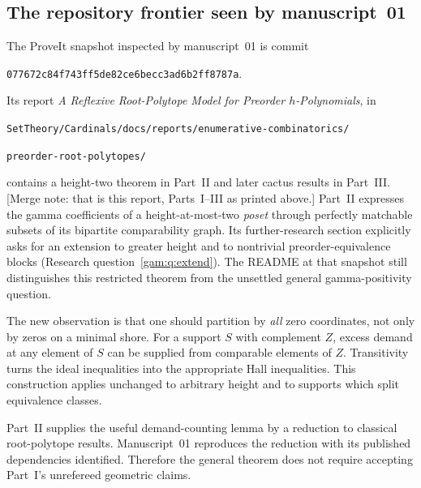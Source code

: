 \documentclass[11pt]{article}
\numberwithin{equation}{section}
\theoremstyle{definition}
\begin{document}
\subsection{The repository frontier seen by manuscript~01}
The ProveIt snapshot inspected by manuscript~01 is commit
\begin{center}
\small\texttt{077672c84f743ff5de82ce6becc3ad6b2ff8787a}.
\end{center}
Its report \emph{A Reflexive Root-Polytope Model for Preorder
$h$-Polynomials}, in
\begin{center}\small
\nolinkurl{SetTheory/Cardinals/docs/reports/enumerative-combinatorics/}\par
\nolinkurl{preorder-root-polytopes/}
\end{center}
contains a height-two theorem in Part~II and later cactus results in
Part~III. [Merge note: that is this report, Parts~I--III as printed above.]
Part~II expresses the gamma coefficients of a height-at-most-two
\emph{poset} through perfectly matchable subsets of its bipartite
comparability graph. Its further-research section explicitly asks for an
extension to greater height and to nontrivial preorder-equivalence blocks
(Research question~\ref{gam:q:extend}). The README at that snapshot still
distinguishes this restricted theorem from the unsettled general
gamma-positivity question.

The new observation is that one should partition by \emph{all} zero
coordinates, not only by zeros on a minimal shore. For a support $S$ with
complement $Z$, excess demand at any element of $S$ can be supplied from
comparable elements of $Z$. Transitivity turns the ideal inequalities into
the appropriate Hall inequalities. This construction applies unchanged to
arbitrary height and to supports which split equivalence classes.

Part~II supplies the useful demand-counting lemma by a reduction to
classical root-polytope results. Manuscript~01 reproduces the reduction with
its published dependencies identified. Therefore the general theorem does
not require accepting Part~I's unrefereed geometric claims.
\end{document}
